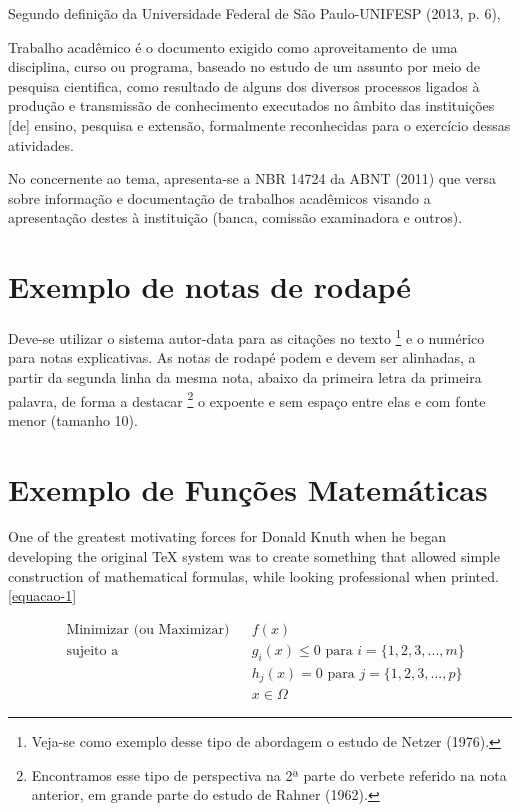 Segundo definição da Universidade Federal de São Paulo-UNIFESP (2013, p. 6),

\begin{citacao}
Trabalho acadêmico é o documento exigido como aproveitamento de uma disciplina, curso ou programa, baseado no estudo de um assunto por meio de pesquisa cientifica, como resultado de alguns dos diversos processos ligados à produção e transmissão de conhecimento executados no âmbito das instituições [de] ensino, pesquisa e extensão, formalmente reconhecidas para o exercício dessas atividades.
\end{citacao}

No concernente ao tema, apresenta-se a NBR 14724 da ABNT (2011) que versa sobre informação e documentação de trabalhos acadêmicos visando a apresentação destes à instituição (banca, comissão examinadora e outros).

\section{Exemplo de notas de rodapé}

Deve-se utilizar o sistema autor-data para as citações no texto \footnote{Veja-se como exemplo desse tipo de abordagem o estudo de Netzer (1976).} e o numérico para notas explicativas. As notas de rodapé podem e devem ser alinhadas, a partir da segunda linha da mesma nota, abaixo da primeira letra da primeira palavra, de forma a destacar \footnote{Encontramos esse tipo de perspectiva na 2ª parte do verbete referido na nota anterior, em grande parte do estudo de Rahner (1962).} o expoente e sem espaço entre elas e com fonte menor (tamanho 10).


\section{Exemplo de Funções Matemáticas}

One of the greatest motivating forces for Donald Knuth when he began developing the original TeX system was to create something that allowed simple construction of mathematical formulas, while looking professional when printed. \autoref{equacao-1}

\begin{equation}
	\label{equacao-1}
	\begin{aligned}
		& \text{Minimizar (ou Maximizar)}
		& & f(x) \\
		& \text{sujeito a}
		& & g_i(x) \leq 0 \text{ para } i=\{1,2,3,...,m\} \\
		&&& h_j(x) = 0 \text{ para } j=\{1,2,3,...,p\} \\
		&&& x \in \Omega
	\end{aligned}
\end{equation}

